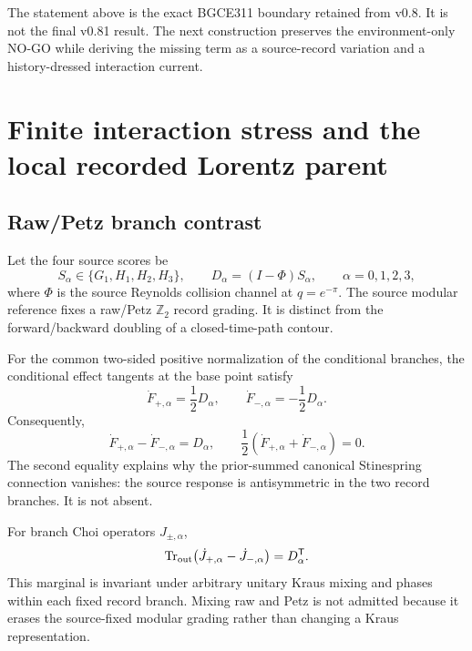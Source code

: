 \documentclass[11pt]{article}
\theoremstyle{definition}
\theoremstyle{remark}
\begin{document}
The statement above is the exact BGCE311 boundary retained from v0.8. It is not the final v0.81 result. The next construction preserves the environment-only NO-GO while deriving the missing term as a source-record variation and a history-dressed interaction current.

\section{Finite interaction stress and the local recorded Lorentz parent}\label{sec:finiteparent081}

\subsection{Raw/Petz branch contrast}

Let the four source scores be
\begin{equation}
 S_\alpha\in\{G_1,H_1,H_2,H_3\},\qquad
 D_\alpha=(I-\Phi)S_\alpha,
 \qquad \alpha=0,1,2,3,
\end{equation}
where $\Phi$ is the source Reynolds collision channel at $q=e^{-\pi}$. The source modular reference fixes a raw/Petz $\mathbb Z_2$ record grading. It is distinct from the forward/backward doubling of a closed-time-path contour.

For the common two-sided positive normalization of the conditional branches, the conditional effect tangents at the base point satisfy
\begin{equation}\label{eq:branchcontrast}
 \dot F_{+,\alpha}=\frac12D_\alpha,
 \qquad
 \dot F_{-,\alpha}=-\frac12D_\alpha.
\end{equation}
Consequently,
\begin{equation}
 \dot F_{+,\alpha}-\dot F_{-,\alpha}=D_\alpha,
 \qquad
 \frac12(\dot F_{+,\alpha}+\dot F_{-,\alpha})=0.
\end{equation}
The second equality explains why the prior-summed canonical Stinespring connection vanishes: the source response is antisymmetric in the two record branches. It is not absent.

For branch Choi operators $J_{\pm,\alpha}$,
\begin{equation}
 \operatorname{Tr}_{\rm out}
 \bigl(\dot J_{+,\alpha}-\dot J_{-,\alpha}\bigr)
 =D_\alpha^{\mathsf T}.
\end{equation}
This marginal is invariant under arbitrary unitary Kraus mixing and phases within each fixed record branch. Mixing raw and Petz is not admitted because it erases the source-fixed modular grading rather than changing a Kraus representation.
\end{document}
